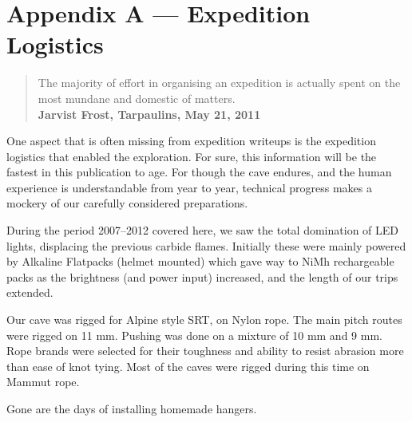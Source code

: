 \chapter{Appendix A --- Expedition
Logistics}

\begin{quote}   
The majority of effort in organising an expedition is actually spent on the most mundane and domestic of matters.\\ 
\textbf{Jarvist Frost, Tarpaulins, May 21, 2011}
\end{quote}

One aspect that is often missing from expedition writeups is the
expedition logistics that enabled the exploration. For sure, this
information will be the fastest in this publication to age. For though the cave endures, and the human experience is understandable from year to year, technical progress makes a mockery of our carefully considered preparations.

During the period 2007--2012 covered here, we saw the total domination
of LED lights, displacing the previous carbide flames. Initially these
were mainly powered by Alkaline Flatpacks (helmet mounted) which gave
way to NiMh rechargeable packs as the brightness (and power input)
increased, and the length of our trips extended.

Our cave was rigged for Alpine style SRT, on Nylon rope. The main pitch
routes were rigged on 11 mm. Pushing was done on a mixture of 10 mm and
9 mm. Rope brands were selected for their toughness and ability to
resist abrasion more than ease of knot tying. Most of the caves were
rigged during this time on Mammut rope.

\begin{marginfigure}
\checkoddpage \ifoddpage \forcerectofloat \else \forceversofloat \fi
\centering
 \caption{Gone are the days of installing homemade hangers. }
 \label{homemade hanger}
\end{marginfigure}

